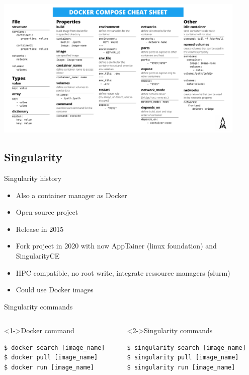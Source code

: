 \begin{frame}
\centering\includegraphics[width=0.9\textwidth]{docker-compose-cheat-sheet.pdf}
\end{frame}

\subsection{Singularity}
\begin{frame}[<+->]{Singularity history}
\begin{itemize}
\item Also a container manager as Docker
\item Open-source project
\item Release in 2015
\item Fork project in 2020 with now AppTainer (linux foundation) and SingularityCE
\item HPC compatible, no root write, integrate ressource managers (slurm)
\item Could use Docker images
\end{itemize}
\end{frame}

\begin{frame}[fragile]{Singularity commands}
\begin{columns}
\begin{column}{0.45\textwidth}
\begin{block}<1->{Docker command}
\begin{verbatim}
$ docker search [image_name]
$ docker pull [image_name]
$ docker run [image_name]
\end{verbatim}
\end{block}
\end{column}
\begin{column}{0.45\textwidth}
\begin{block}<2->{Singularity commands}
\begin{verbatim}
$ singularity search [image_name]
$ singularity pull [image_name]
$ singularity run [image_name]
\end{verbatim}
\end{block}
\end{column}
\end{columns}
\end{frame}

